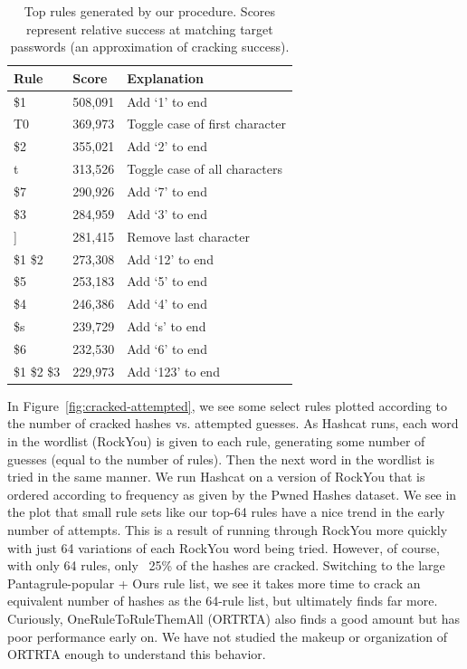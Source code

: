 \documentclass[letterpaper,twocolumn,10pt]{article}
\begin{document}
\begin{table}
\centering
\begin{tabular}{|l|l|l|}
\hline
Rule & Score & Explanation \\
\hline
\$1 & 508,091 & Add `1' to end \\
T0 & 369,973 & Toggle case of first character \\
\$2 & 355,021 & Add `2' to end \\
t & 313,526 & Toggle case of all characters \\
\$7 & 290,926 & Add `7' to end \\
\$3 & 284,959 & Add `3' to end \\
] & 281,415 & Remove last character \\
\$1 \$2 & 273,308 & Add `12' to end \\
\$5 & 253,183 & Add `5' to end \\
\$4 & 246,386 & Add `4' to end \\
\$s & 239,729 & Add `s' to end \\
\$6 & 232,530 & Add `6' to end \\
\$1 \$2 \$3 & 229,973 & Add `123' to end \\
\hline
\end{tabular}
\caption{Top rules generated by our procedure. Scores represent relative
success at matching target passwords (an approximation of cracking success).}
\label{tab:top_rules}
\end{table}

In Figure~\ref{fig:cracked-attempted}, we see some select rules plotted
according to the number of cracked hashes vs. attempted guesses. As Hashcat
runs, each word in the wordlist (RockYou) is given to each rule, generating
some number of guesses (equal to the number of rules). Then the next word in
the wordlist is tried in the same manner. We run Hashcat on a version of
RockYou that is ordered according to frequency as given by the Pwned Hashes
dataset\cite{pwned}. We see in the plot that small rule sets like our top-64
rules have a nice trend in the early number of attempts. This is a result of
running through RockYou more quickly with just 64 variations of each RockYou
word being tried. However, of course, with only 64 rules, only ~25\% of the
hashes are cracked. Switching to the large Pantagrule-popular + Ours rule list,
we see it takes more time to crack an equivalent number of hashes as the
64-rule list, but ultimately finds far more. Curiously, OneRuleToRuleThemAll
(ORTRTA) also finds a good amount but has poor performance early on. We have
not studied the makeup or organization of ORTRTA enough to understand this
behavior.
\end{document}
